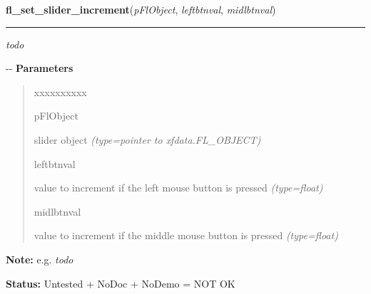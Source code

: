 \hspace{.8\funcindent}\begin{boxedminipage}{\funcwidth}

    \raggedright \textbf{fl\_set\_slider\_increment}(\textit{pFlObject}, \textit{leftbtnval}, \textit{midlbtnval})

    \vspace{-1.5ex}

    \rule{\textwidth}{0.5\fboxrule}
\setlength{\parskip}{2ex}

\emph{todo}

-{}-
\setlength{\parskip}{1ex}
      \textbf{Parameters}
      \vspace{-1ex}

      \begin{quote}
        \begin{Ventry}{xxxxxxxxxx}

          \item[pFlObject]


slider object
            {\it (type=pointer to xfdata.FL\_OBJECT)}

          \item[leftbtnval]


value to increment if the left mouse button is pressed
            {\it (type=float)}

          \item[midlbtnval]


value to increment if the middle mouse button is pressed
            {\it (type=float)}

        \end{Ventry}

      \end{quote}

\textbf{Note:} 
e.g. \emph{todo}


\textbf{Status:} 
Untested + NoDoc + NoDemo = NOT OK


    \end{boxedminipage}

    \label{xformslib:flslider:fl_get_slider_increment}

    \vspace{0.5ex}

